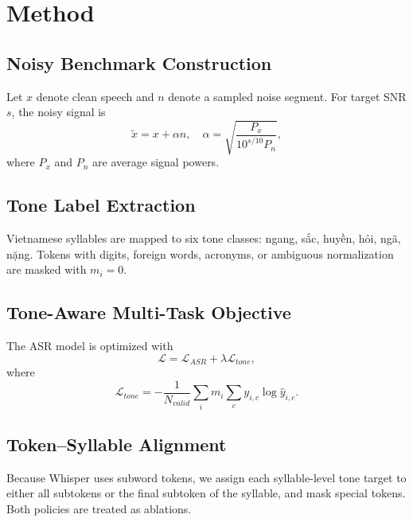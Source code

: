 \section{Method}
\subsection{Noisy Benchmark Construction}
Let $x$ denote clean speech and $n$ denote a sampled noise segment. For target SNR $s$, the noisy signal is
\begin{equation}
    \tilde{x} = x + \alpha n, \quad
    \alpha = \sqrt{\frac{P_x}{10^{s/10} P_n}},
\end{equation}
where $P_x$ and $P_n$ are average signal powers.

\subsection{Tone Label Extraction}
Vietnamese syllables are mapped to six tone classes: ngang, sắc, huyền, hỏi, ngã, nặng. Tokens with digits, foreign words, acronyms, or ambiguous normalization are masked with $m_i=0$.

\subsection{Tone-Aware Multi-Task Objective}
The ASR model is optimized with
\begin{equation}
    \mathcal{L}=\mathcal{L}_{ASR}+\lambda \mathcal{L}_{tone},
\end{equation}
where
\begin{equation}
    \mathcal{L}_{tone}= -\frac{1}{N_{valid}} \sum_i m_i \sum_c y_{i,c}\log \hat{y}_{i,c}.
\end{equation}

\subsection{Token--Syllable Alignment}
Because Whisper uses subword tokens, we assign each syllable-level tone target to either all subtokens or the final subtoken of the syllable, and mask special tokens. Both policies are treated as ablations.
